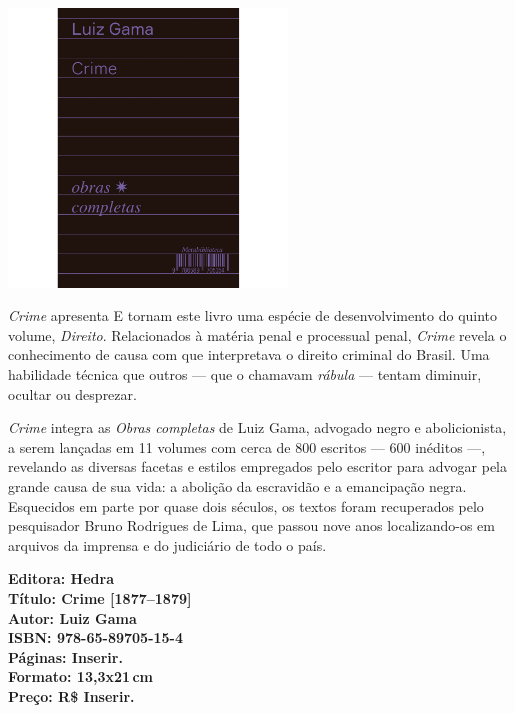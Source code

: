 \begin{center}
\hspace*{.5cm}\includegraphics[width=74mm]{./CAPAS/HEDRA_CRIME.jpg}
\end{center}
\hspace*{-7cm}\hrulefill\hspace*{-7cm}
\medskip

\noindent{}\textit{Crime} apresenta  E tornam este livro uma espécie de desenvolvimento do quinto volume, \textit{Direito}. Relacionados à matéria penal e processual penal, \textit{Crime} revela o conhecimento de causa com que interpretava o direito criminal do Brasil. Uma habilidade técnica que outros --- que o chamavam \textit{rábula} --- tentam diminuir, ocultar ou desprezar.

\textit{Crime} integra as \textit{Obras completas} de Luiz Gama, advogado negro e abolicionista, a serem lançadas em 11 volumes com cerca de 800 escritos --- 600 inéditos ---, revelando as diversas facetas e estilos empregados pelo escritor para advogar pela grande causa de sua vida: a abolição da escravidão e a emancipação negra. Esquecidos em parte por quase dois séculos, os textos foram recuperados pelo pesquisador Bruno Rodrigues de Lima, que passou nove anos localizando-os em arquivos da imprensa e do judiciário de todo o país.

\vfill
\noindent\begin{minipage}[c]{1\linewidth}
{\small\textbf{
\hspace*{-.1cm}Editora: Hedra\\
Título: Crime [1877--1879]\\
Autor: Luiz Gama\\ 
ISBN: 978-65-89705-15-4\\
Páginas: Inserir.\\
Formato: 13,3x21\,cm\\
Preço: R\$ Inserir.\\
}}
\end{minipage}
\pagebreak

